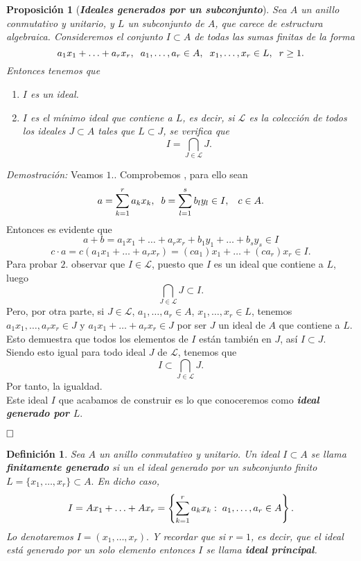 \documentclass[12pt]{article}
\newtheorem{proposition}[theorem]{Proposición}
\newtheorem{definition}[theorem]{Definición}
\begin{document}
\begin{proposition}[\textbf{\textit{Ideales generados por un subconjunto}}]
Sea $A$ un anillo conmutativo y unitario, y $L$ un subconjunto de $A$, que carece de estructura algebraica. Consideremos el conjunto $I \subset A$ de todas las sumas finitas de la forma $$a_{1}x_{1} + \ldots + a_{r}x_{r}, \hspace{0.2cm} a_{1}, \ldots, a_{r} \in A, \hspace{0.2cm} x_{1}, \ldots, x_{r} \in L, \hspace{0.2cm} r \geq 1.$$ Entonces tenemos que \begin{enumerate}
\item $I$ es un ideal.
\item $I$ es el mínimo ideal que contiene a $L$, es decir, si $\mathcal{L}$ es la colección de todos los ideales $J \subset A$ tales que $ L \subset J$, se verifica que $$I = \bigcap_{J \in \mathcal{L}} J.$$
\end{enumerate}
\end{proposition}
\emph{Demostración: } Veamos $1.$. Comprobemos , para ello sean $$a = \sum_{k =1}^{r}a_{k}x_{k}, \hspace{0.2cm} b= \sum_{l=1}^{s} b_{l}y_{l} \in I, \hspace{0.3cm} c \in A.$$ Entonces es evidente que $$a+b = a_{1}x_{1} + \ldots + a_{r}x_{r} + b_{1}y_{1} + \ldots + b_{s}y_{s} \in I$$ $$c \cdot a = c(a_{1}x_{1} + \ldots + a_{r}x_{r}) =(ca_{1})x_{1} + \ldots + (ca_{r})x_{r} \in I.$$ Para probar $2.$ observar que $I \in \mathcal{L}$, puesto que $I$ es un ideal que contiene a $L$, luego $$\bigcap_{J \in \mathcal{L}} J \subset I.$$ Pero, por otra parte, si $J \in \mathcal{L}$, $a_{1}, \ldots, a_{r} \in A$, $x_{1}, \ldots, x_{r} \in L$, tenemos $a_{1}x_{1}, \ldots, a_{r}x_{r} \in J$ y $a_{1}x_{1}+ \ldots + a_{r}x_{r} \in J$ por ser $J$ un ideal de $A$ que contiene a $L$. Esto demuestra que todos los elementos de $I$ están también en $J$, así $I \subset J$. Siendo esto igual para todo ideal $J$ de $\mathcal{L}$, tenemos que $$I \subset \bigcap_{J \in \mathcal{L}} J.$$ Por tanto, la igualdad.\vspace{0.2cm}\\
Este ideal $I$ que acabamos de construir es lo que conoceremos como \textbf{\textit{ideal generado por $L$}}.

$\hfill \square$

\begin{definition} Sea $A$ un anillo conmutativo y unitario. Un ideal $I \subset A$ se llama \textbf{finitamente generado} si un el ideal generado por un subconjunto finito $L = \lbrace x_{1}, \ldots, x_{r}\rbrace \subset A.$ En dicho caso, $$I = Ax_{1} + \ldots + Ax_{r} = \left\lbrace \sum_{k=1}^{r}a_{k}x_{k} : \hspace{0.1cm} a_{1}, \ldots, a_{r} \in A \right\rbrace.$$ Lo denotaremos $I = (x_{1}, \ldots, x_{r}).$ Y recordar que si $r=1$, es decir, que el ideal está generado por un solo elemento entonces $I$ se llama \textbf{ideal principal}.
\end{definition}
\end{document}
